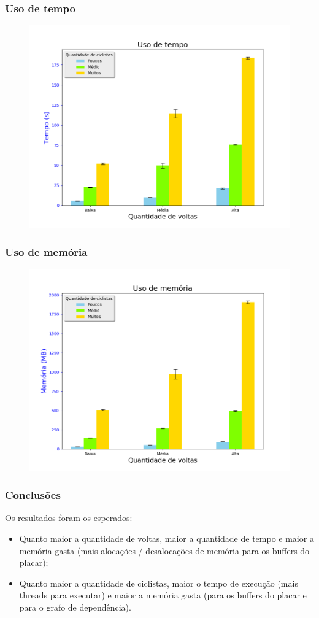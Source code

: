 \documentclass{beamer}
\begin{document}
\begin{frame}
\frametitle{Uso de tempo}
\begin{figure}
\includegraphics[scale=0.4]{time_usage.png}
\end{figure}
\end{frame}

\begin{frame}
\frametitle{Uso de memória}
\begin{figure}
\includegraphics[scale=0.4]{mem_usage.png}
\end{figure}
\end{frame}

\begin{frame}
\frametitle{Conclusões}
Os resultados foram os esperados:
\begin{itemize}
\item Quanto maior a quantidade de voltas, maior a quantidade de tempo e maior a memória gasta (mais alocações / desalocações de memória para os buffers do placar);
\item Quanto maior a quantidade de ciclistas, maior o tempo de execução (mais threads para executar) e maior a memória gasta (para os buffers do placar e para o grafo de dependência).
\end{itemize}

\end{frame}
\end{document}

